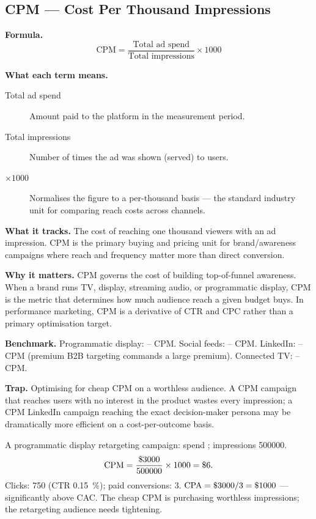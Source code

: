 \subsection{CPM --- Cost Per Thousand Impressions}

\textbf{Formula.}
\[
  \mathrm{CPM} = \frac{\text{Total ad spend}}{\text{Total impressions}} \times 1000
\]

\textbf{What each term means.}
\begin{description}
  \item[Total ad spend] Amount paid to the platform in the measurement period.
  \item[Total impressions] Number of times the ad was shown (served) to users.
  \item[$\times 1000$] Normalises the figure to a per-thousand basis --- the standard
    industry unit for comparing reach costs across channels.
\end{description}

\textbf{What it tracks.} The cost of reaching one thousand viewers with an ad impression.
CPM is the primary buying and pricing unit for brand/awareness campaigns where
reach and frequency matter more than direct conversion.

\textbf{Why it matters.} CPM governs the cost of building top-of-funnel awareness. When
a brand runs TV, display, streaming audio, or programmatic display, CPM is the metric that
determines how much audience reach a given budget buys. In performance marketing, CPM is a
derivative of CTR and CPC rather than a primary optimisation target.

\textbf{Benchmark.} Programmatic display: -- CPM. Social feeds:
-- CPM. LinkedIn: -- CPM (premium B2B targeting
commands a large premium). Connected TV: -- CPM.

\textbf{Trap.} Optimising for cheap CPM on a worthless audience. A  CPM campaign
that reaches users with no interest in the product wastes every impression; a  CPM
LinkedIn campaign reaching the exact decision-maker persona may be dramatically more
efficient on a cost-per-outcome basis.

\begin{example}
A programmatic display retargeting campaign: spend ; impressions \num{500000}.
\[
  \mathrm{CPM} = \frac{\$\num{3000}}{500000} \times 1000 = \$\num{6}.
\]
Clicks: \num{750} (CTR \qty{0.15}{\percent}); paid conversions: 3.
$\mathrm{CPA} = \$\num{3000}/3 = \$\num{1000}$ --- significantly above CAC. The cheap CPM
is purchasing worthless impressions; the retargeting audience needs tightening.
\end{example}


